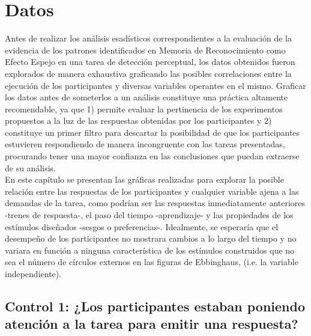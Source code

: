 
\chapter{Datos} %

\label{Cap_Data} %


Antes de realizar los análisis esadísticos correspondientes a la evaluación de la evidencia de los patrones identificados en Memoria de Reconocimiento como Efecto Espejo en una tarea de detección perceptual, los datos obtenidos fueron explorados de manera exhaustiva graficando las posibles correlaciones entre la ejecución de los participantes y diversas variables operantes en el mismo. Graficar los datos antes de someterlos a un análisis constituye una práctica altamente recomendable, ya que 1) permite evaluar la pertinencia de los experimentos propuestos a la luz de las respuestas obtenidas por los participantes y 2) constituye un primer filtro para descartar la posibilidad de que los participantes estuvieren respondiendo de manera incongruente con las tareas presentadas, procurando tener una mayor confianza en las conclusiones que puedan extraerse de su análisis.\\

En este capítulo se presentan las gráficas realizadas para explorar la posible relación entre las respuestas de los participantes y cualquier variable ajena a las demandas de la tarea, como podrían ser las respuestas inmediatamente anteriores -trenes de respuesta-, el paso del tiempo -aprendizaje- y las propiedades de los estímulos diseñados -sesgos o preferencias-. Idealmente, se esperaría que el desempeño de los participantes no mostrara cambios a lo largo del tiempo y no variara en función a ninguna característica de los estímulos construidos que no sea el número de círculos externos en las figuras de Ebbinghaus, (i.e. la variable independiente).\\








\section{Control 1: ¿Los participantes estaban poniendo atención a la tarea para emitir una respuesta?}

